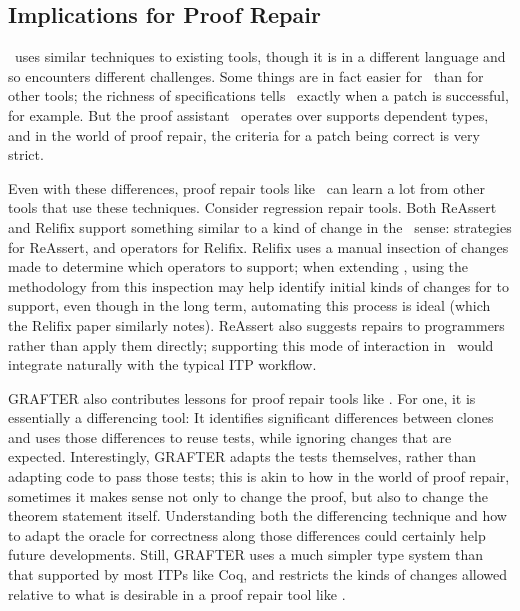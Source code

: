 \subsection{Implications for Proof Repair}

\sysname\ uses similar techniques to existing tools, though it is in a different language
and so encounters different challenges. Some things are in fact easier for \sysname\ than for other tools;
the richness of specifications tells \sysname\ exactly when a patch is successful, for example. 
But the proof assistant \sysname\ operates over supports dependent types, and in the world of proof repair,
the criteria for a patch being correct is very strict. 

Even with these differences, proof repair tools like \sysname\ can learn a lot from other tools that use these techniques.
Consider regression repair tools. %
Both ReAssert and Relifix support something similar to a kind of change in the \sysname\ sense:
strategies for ReAssert, and operators for Relifix. Relifix uses a manual insection of changes made to determine which operators to support;
when extending \sysname, using the methodology from this inspection may help identify initial kinds of changes for \sysname to support, even though
in the long term, automating this process is ideal (which the Relifix paper similarly notes).
ReAssert also suggests repairs to programmers rather than apply them directly; %
supporting this mode of interaction in \sysname\ would integrate
naturally with the typical ITP workflow.

GRAFTER also contributes lessons for proof repair tools like \sysname.
For one, it is essentially a differencing tool: It identifies significant differences between clones and uses those differences
to reuse tests, while ignoring changes that are expected. Interestingly, GRAFTER adapts the tests themselves, rather than adapting code to pass
those tests; this is akin to how in the world of proof repair, sometimes it makes sense not only to change the proof,
but also to change the theorem statement itself. Understanding both the differencing technique and how to adapt the oracle for correctness
along those differences could certainly help future developments.
Still, GRAFTER uses a much simpler type system than that supported by most ITPs like Coq, and restricts the kinds of changes allowed relative to what
is desirable in a proof repair tool like \sysname. %

